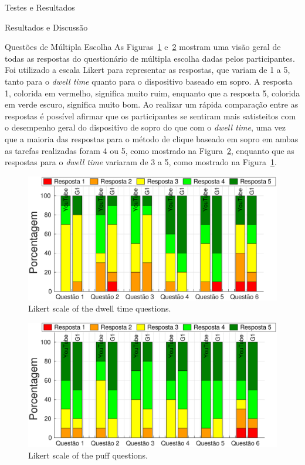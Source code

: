 \begin{chapter}{Testes e Resultados}
\begin{section}{Resultados e Discussão}
\begin{subsection}{Questões de Múltipla Escolha}
As Figuras~\ref{fig:DwellQuestions} e~\ref{fig:PuffQuestions} mostram uma visão
geral de todas as respostas do questionário de múltipla escolha dadas pelos
participantes. Foi utilizado a escala Likert para representar as respostas, que
variam de 1 a 5, tanto para o \textit{dwell time} quanto para o dispositivo
baseado em sopro.  A resposta 1, colorida em vermelho, significa muito ruim,
enquanto que a resposta 5, colorida em verde escuro, significa muito bom. Ao
realizar um rápida comparação entre as respostas é possível afirmar que os
participantes se sentiram mais satisteitos com o desempenho geral do dispositivo
de sopro do que com o \textit{dwell time}, uma vez que a maioria das respostas
para o método de clique baseado em sopro em ambas as tarefas realizadas foram 4
ou 5, como mostrado na Figura~\ref{fig:PuffQuestions}, enquanto que as respostas
para o \textit{dwell time} variaram de 3 a 5, como mostrado na
Figura~\ref{fig:DwellQuestions}.  

\begin{figure}[!h]
	\centering
	\begin{minipage}[c]{\textwidth}
	\centering
	\includegraphics[width=0.9\linewidth]{fig/DwellQuestions}
	\caption{Likert scale of the dwell time questions.} 
	\label{fig:DwellQuestions}
	\end{minipage}
\end{figure}

\begin{figure}[!h]
	\centering
	\begin{minipage}[c]{\textwidth}
	\centering
	\includegraphics[width=0.9\linewidth]{fig/PuffQuestions}
	\caption{Likert scale of the puff questions.}
	\label{fig:PuffQuestions}
	\end{minipage}
\end{figure}




\end{subsection}
\end{section}
\end{chapter}
